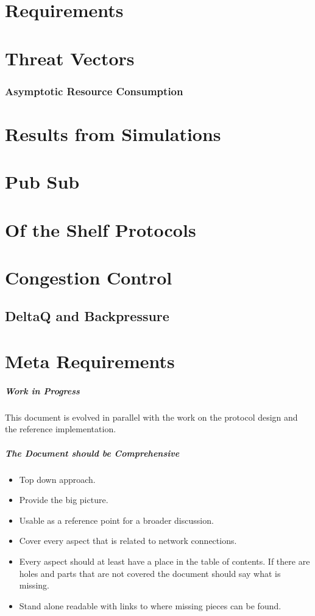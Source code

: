 \documentclass{report}
\newcommand{\wip}[1]{\color{magenta}{#1}\color{black}}
\theoremstyle{definition}{
  \newtheorem{lemma}{Lemma}[section] %
  \newtheorem{definition}[lemma]{Definition}
}
\theoremstyle{theorem}{
  \newtheorem{invariant}[lemma]{Invariant}
  \newtheorem{proofobligation}[lemma]{Proof Obligation}
}
\numberwithin{equation}{lemma}
\begin{document}
\section{Requirements}
\section{Threat Vectors}
\subsubsection{Asymptotic Resource Consumption}
\section{Results from Simulations}
\section{Pub Sub}
\section{Of the Shelf Protocols}
\section{Congestion Control}
\subsection{DeltaQ and Backpressure}
\label{deltaq-discussion}
\wip{WIP: discuss DeltaQ and Backpressure}

\section{Meta Requirements}
\subparagraph{Work in Progress}
This document is evolved in parallel with the work on the protocol design and
the reference implementation.

\subparagraph{The Document should be Comprehensive}
\begin{itemize}
\item Top down approach.
\item Provide the big picture.
\item Usable as a reference point for a broader discussion.
\item Cover every aspect that is related to network connections.
\item Every aspect should at least have a place in the table of contents.
  If there are holes and parts that are not covered the document should say what is missing.
\item Stand alone readable with links to where missing pieces can be found.
\end{itemize}
\end{document}
